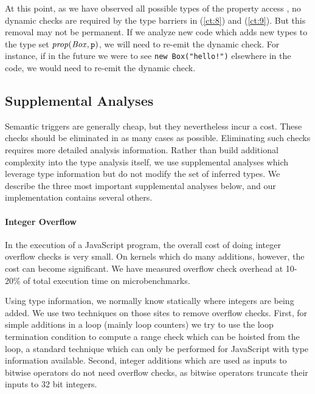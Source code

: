At this point, as we have observed all possible types of the property access
, no dynamic checks are required by the type barriers
in (\ref{ct:8}) and (\ref{ct:9}).
But this removal may
not be permanent. If we analyze new code which adds new types to the type set
$\mathit{prop}(\mathit{Box}, \texttt{p})$, we will need to re-emit the dynamic
check. For instance, if in the future we were to see \lstinline{new Box("hello!")}
elsewhere in the code, we would need to re-emit the dynamic check.

\subsection{Supplemental Analyses}
\label{sec:supplemental-analyses}

Semantic triggers are generally cheap, but they nevertheless incur a cost.
These checks should be eliminated in as many cases as possible.
Eliminating such checks requires more detailed analysis information.
Rather than build additional complexity into the type analysis itself,
we use supplemental analyses which leverage type information but do not
modify the set of inferred types.
We describe the three most important supplemental analyses below, and
our implementation contains several others.

\paragraph{Integer Overflow}

In the execution of a JavaScript program, the overall cost of doing integer
overflow checks is very small.
On kernels which do many additions, however, the cost can become significant.
We have measured overflow check overhead at 10-20\% of total execution
time on microbenchmarks.

Using type information, we normally know statically where integers are being
added. We use two techniques on those sites to remove overflow checks.
First, for simple additions in a loop (mainly loop counters) we try to use
the loop termination condition to compute a range
check which can be hoisted from the loop, a standard technique
which can only be performed for JavaScript with type information available.
Second, integer additions which are used as inputs to bitwise operators
do not need overflow checks, as bitwise operators truncate their inputs to 32
bit integers.

